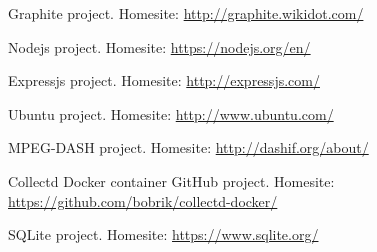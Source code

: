 \documentclass[english,final]{setup/eetac_tfc_pfc}
\begin{document}
\begin{thebibliography}{2}
Graphite project. Homesite: \url{http://graphite.wikidot.com/}

Nodejs project. Homesite: \url{https://nodejs.org/en/}

Expressjs project. Homesite: \url{http://expressjs.com/}

Ubuntu project. Homesite: \url{http://www.ubuntu.com/}

MPEG-DASH project. Homesite: \url{http://dashif.org/about/}

Collectd Docker container GitHub project. Homesite: \url{https://github.com/bobrik/collectd-docker/}

SQLite project. Homesite: \url{https://www.sqlite.org/}



\end{thebibliography}
\pagestyle{empty}  %

\appendix\senseportada













\end{document}
